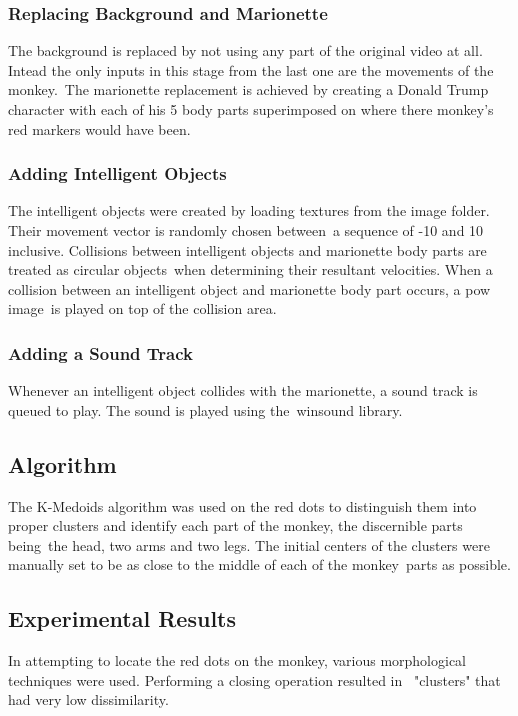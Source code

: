 \documentclass[12pt,a4paper]{article}
\begin{document}
        \subsubsection{Replacing Background and Marionette}
        The background is replaced by not using any part of the original video at all. Intead the only inputs in this stage from the last one are the movements of the monkey.\
        The marionette replacement is achieved by creating a Donald Trump character with each of his 5 body parts superimposed on where there monkey's red markers would have been.

        \subsubsection{Adding Intelligent Objects}
        The intelligent objects were created by loading textures from the image folder. Their movement vector is randomly chosen between\
        a sequence of -10 and 10 inclusive. Collisions between intelligent objects and marionette body parts are treated as circular objects\
        when determining their resultant velocities. When a collision between an intelligent object and marionette body part occurs, a pow image\
        is played on top of the collision area.

        \subsubsection{Adding a Sound Track}
        Whenever an intelligent object collides with the marionette, a sound track is queued to play. The sound is played using the\
        winsound library.

      \subsection{Algorithm}
      The K-Medoids algorithm was used on the red dots to distinguish them into proper clusters and identify each part of the monkey, the discernible parts being\
      the head, two arms and two legs. The initial centers of the clusters were manually set to be as close to the middle of each of the monkey\
      parts as possible.

      \subsection{Experimental Results}
      In attempting to locate the red dots on the monkey, various morphological techniques were used. Performing a closing operation resulted in \
      "clusters" that had very low dissimilarity.\\
\end{document}
